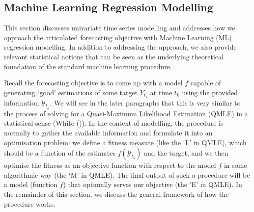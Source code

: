 \subsection{Machine Learning Regression Modelling}\label{subsec: ML modelling}
This section discusses univariate time series modelling and addresses how we approach the articulated forecasting objective with Machine Learning (ML) regression modelling. In addition to addressing the approach, we also provide relevant statistical notions that can be seen as the underlying theoretical foundation of the standard machine learning procedure.

Recall the forecasting objective is to come up with a model $f$ capable of generating `good' estimations of some target $Y_{t_s}$ at time $t_k$ using the provided information $\mathcal{Y}_{t_k}$. We will see in the later paragraphs that this is very similar to the process of solving for a Quasi-Maximum Likelihood Estimation (QMLE) in a statistical sense (White (\citeyear{white1982maximum})). In the context of modelling, the procedure is normally to gather the available information and formulate it into an optimisation problem: we define a fitness measure (like the `L' in QMLE), which should be a function of the estimates $f(\mathcal{Y}_{t_k})$ and the target, and we then optimise the fitness as an objective function with respect to the model $f$ in some algorithmic way (the `M' in QMLE). The final output of such a procedure will be a model (function $f$) that optimally serves our objective (the `E' in QMLE). In the remainder of this section, we discuss the general framework of how the procedure works.


